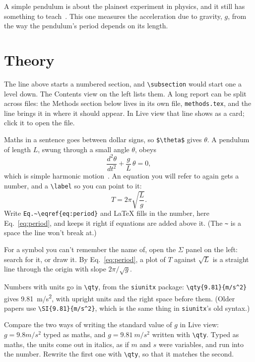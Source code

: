 \documentclass[reprint,aps,pra]{revtex4-2} %
\begin{document}
A simple pendulum is about the plainest experiment in physics, and it still has something to teach~\cite{nelson1986}. This one measures the acceleration due to gravity, $g$, from the way the pendulum's period depends on its length.

\section{Theory}

The line above starts a numbered section, and \verb|\subsection| would start one a level down. The Contents view on the left lists them. A long report can be split across files: the Methods section below lives in its own file, \texttt{methods.tex}, and the line \verb|| brings it in where it should appear. In Live view that line shows as a card; click it to open the file.

Maths in a sentence goes between dollar signs, so \verb|$\theta$| gives $\theta$. A pendulum of length $L$, swung through a small angle $\theta$, obeys
\[
  \frac{d^2\theta}{dt^2} + \frac{g}{L}\,\theta = 0,
\]
which is simple harmonic motion~\cite{belendez2007}. An equation you will refer to again gets a number, and a \verb|\label| so you can point to it:
\begin{equation}
  T = 2\pi\sqrt{\frac{L}{g}}.
  \label{eq:period}
\end{equation}
Write \verb|Eq.~\eqref{eq:period}| and LaTeX fills in the number, here Eq.~\eqref{eq:period}, and keeps it right if equations are added above it. (The \verb|~| is a space the line won't break at.)

For a symbol you can't remember the name of, open the $\Sigma$ panel on the left: search for it, or draw it. By Eq.~\eqref{eq:period}, a plot of $T$ against $\sqrt{L}$ is a straight line through the origin with slope $2\pi/\sqrt{g}$.

Numbers with units go in \verb|\qty|, from the \texttt{siunitx} package: \verb|\qty{9.81}{m/s^2}| gives \qty{9.81}{m/s^2}, with upright units and the right space before them. (Older papers use \verb|\SI{9.81}{m/s^2}|, which is the same thing in \texttt{siunitx}'s old syntax.)

Compare the two ways of writing the standard value of $g$ in Live view: $g = 9.8 m/s^2$ typed as maths, and $g = \qty{9.81}{m/s^2}$ written with \verb|\qty|. Typed as maths, the units come out in italics, as if $m$ and $s$ were variables, and run into the number. Rewrite the first one with \verb|\qty|, so that it matches the second.
\end{document}

